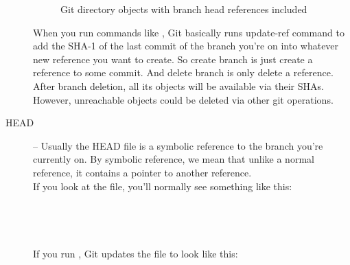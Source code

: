 \begin{description}
\begin{figure}[H]
\begin{center}
{
      }
    \end{center}
    \label{fig:reference}
    \caption{Git directory objects with branch head references included}
  \end{figure}
  When you run commands like ,
  Git basically runs update-ref command to add the SHA-1
  of the last commit of the branch you're on into whatever
  new reference you want to create.
  So create branch is just create a reference to some commit.
  And delete branch is only delete a reference.
  After branch deletion, all its objects will be available via their SHAs.
  However, unreachable objects could be deleted via other git operations.
  \item[HEAD] -- Usually the HEAD file is a symbolic reference to the branch
  you're currently on.
  By symbolic reference, we mean that unlike a normal reference,
  it contains a pointer to another reference.\\
  If you look at the file, you'll normally see something like this:\\
  \\
  \\
  \\
  \\If you run , Git updates the file to look like this:\\
  \\
  \\
  \\


\end{description}
